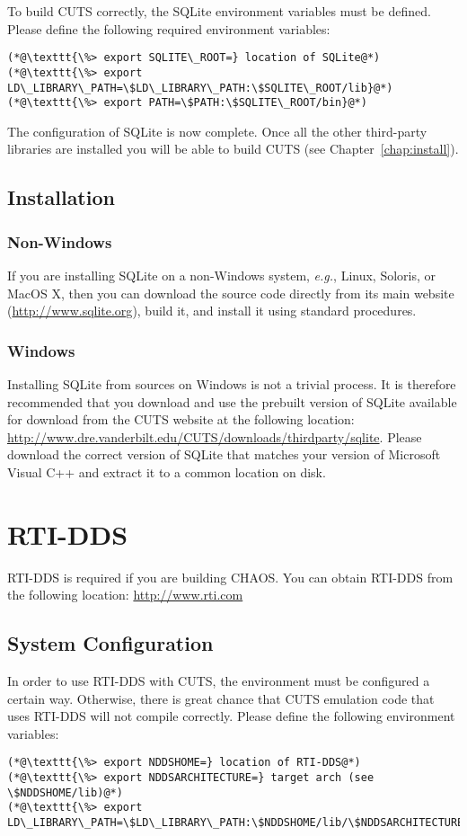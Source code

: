 To build CUTS correctly, the SQLite environment variables must be defined. Please 
define the following required environment variables:
\begin{lstlisting}
(*@\texttt{\%> export SQLITE\_ROOT=} location of SQLite@*)
(*@\texttt{\%> export LD\_LIBRARY\_PATH=\$LD\_LIBRARY\_PATH:\$SQLITE\_ROOT/lib}@*)
(*@\texttt{\%> export PATH=\$PATH:\$SQLITE\_ROOT/bin}@*)
\end{lstlisting}
The configuration of SQLite is now complete. Once all the other
third-party libraries are installed you will be able to build CUTS
(see Chapter~\ref{chap:install}).

\subsection{Installation}

\subsubsection{Non-Windows}
 
If you are installing SQLite on a non-Windows system, \textit{e.g.}, Linux, 
Soloris, or MacOS X, then you can download the source code directly from its
main website (\url{http://www.sqlite.org}), build it, and install it using  
standard procedures.

\subsubsection{Windows}

Installing SQLite from sources on Windows is not a trivial process. 
It is therefore recommended that you download and use the prebuilt 
version of SQLite available for download from the CUTS website at the 
following location:
\url{http://www.dre.vanderbilt.edu/CUTS/downloads/thirdparty/sqlite}. Please download
the correct version of SQLite that matches your version of Microsoft Visual
C++ and extract it to a common location on disk.

\section{RTI-DDS}
\label{sec:thirdparty-rtidds}

RTI-DDS is required if you are building CHAOS. You can obtain RTI-DDS
from the following location: \url{http://www.rti.com}

\subsection{System Configuration}
In order to use RTI-DDS with CUTS, the environment must be configured 
a certain way. Otherwise, there is great chance that CUTS emulation 
code that uses RTI-DDS will not compile correctly. Please define the 
following environment variables:
\begin{lstlisting}
(*@\texttt{\%> export NDDSHOME=} location of RTI-DDS@*)
(*@\texttt{\%> export NDDSARCHITECTURE=} target arch (see \$NDDSHOME/lib)@*)
(*@\texttt{\%> export LD\_LIBRARY\_PATH=\$LD\_LIBRARY\_PATH:\$NDDSHOME/lib/\$NDDSARCHITECTURE}@*)
\end{lstlisting}

